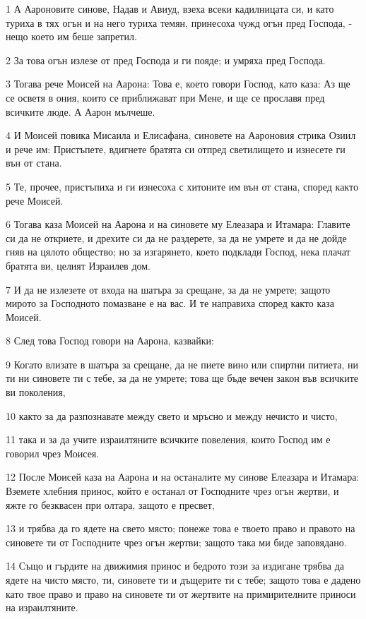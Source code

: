 \par 1 А Аароновите синове, Надав и Авиуд, взеха всеки кадилницата си, и като туриха в тях огън и на него туриха темян, принесоха чужд огън пред Господа, - нещо което им беше запретил.
\par 2 За това огън излезе от пред Господа и ги пояде; и умряха пред Господа.
\par 3 Тогава рече Моисей на Аарона: Това е, което говори Господ, като каза: Аз ще се осветя в ония, които се приближават при Мене, и ще се прославя пред всичките люде. А Аарон мълчеше.
\par 4 И Моисей повика Мисаила и Елисафана, синовете на Аароновия стрика Озиил и рече им: Пристъпете, вдигнете братята си отпред светилището и изнесете ги вън от стана.
\par 5 Те, прочее, пристъпиха и ги изнесоха с хитоните им вън от стана, според както рече Моисей.
\par 6 Тогава каза Моисей на Аарона и на синовете му Елеазара и Итамара: Главите си да не откриете, и дрехите си да не раздерете, за да не умрете и да не дойде гняв на цялото общество; но за изгарянето, което подклади Господ, нека плачат братята ви, целият Израилев дом.
\par 7 И да не излезете от входа на шатъра за срещане, за да не умрете; защото мирото за Господното помазване е на вас. И те направиха според както каза Моисей.
\par 8 След това Господ говори на Аарона, казвайки:
\par 9 Когато влизате в шатъра за срещане, да не пиете вино или спиртни питиета, ни ти ни синовете ти с тебе, за да не умрете; това ще бъде вечен закон във всичките ви поколения,
\par 10 както за да разпознавате между свето и мръсно и между нечисто и чисто,
\par 11 така и за да учите израилтяните всичките повеления, които Господ им е говорил чрез Моисея.
\par 12 После Моисей каза на Аарона и на останалите му синове Елеазара и Итамара: Вземете хлебния принос, който е останал от Господните чрез огън жертви, и яжте го безквасен при олтара, защото е пресвет,
\par 13 и трябва да го ядете на свето място; понеже това е твоето право и правото на синовете ти от Господните чрез огън жертви; защото така ми биде заповядано.
\par 14 Също и гърдите на движимия принос и бедрото този за издигане трябва да ядете на чисто място, ти, синовете ти и дъщерите ти с тебе; защото това е дадено като твое право и право на синовете ти от жертвите на примирителните приноси на израилтяните.

